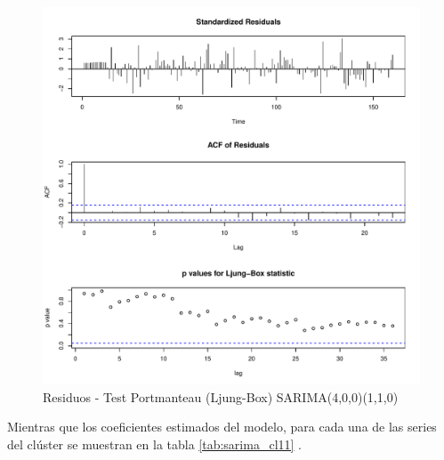\documentclass[12pt,oneside]{book}\usepackage[]{graphicx}\usepackage[]{color}
\makeatletter
\def\maxwidth{ %
  \ifdim\Gin@nat@width>\linewidth
    \linewidth
  \else
    \Gin@nat@width
  \fi
}
\newenvironment{knitrout}{}{} %
\theoremstyle{definition} %
\makeatother
\begin{document}
\begin{knitrout}
\color{fgcolor}\begin{figure}[h]

{\centering \includegraphics[width=\maxwidth]{figure/unnamed-chunk-74-1} 

}

\caption[Residuos - Test Portmanteau (Ljung-Box) SARIMA(4,0,0)(1,1,0)]{Residuos - Test Portmanteau (Ljung-Box) SARIMA(4,0,0)(1,1,0)}\label{fig:unnamed-chunk-74}
\end{figure}


\end{knitrout}


Mientras que los coeficientes estimados del modelo, para cada una de las series del clúster se muestran en la tabla \ref{tab:sarima_cl11} .
\end{document}

